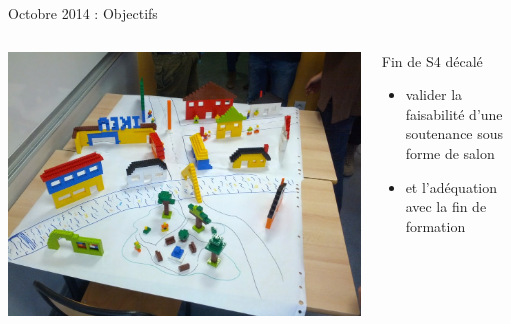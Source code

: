 \documentclass{beamer}
\begin{document}
\begin{frame}{Octobre 2014 : Objectifs}
  \begin{columns}
    \begin{column}{0.5\textwidth}
      \begin{center}
        \includegraphics[width=\textwidth]{includes/2014_S4_lego.jpg}      
      \end{center}
    \end{column}
    \begin{column}{0.5\textwidth}
      Fin de S4 décalé
      \begin{itemize}
        \item valider la faisabilité d'une soutenance sous forme de salon 
        \item et l'adéquation avec la fin de formation
      \end{itemize}
    \end{column}
  \end{columns}
\end{frame}
\end{document}
